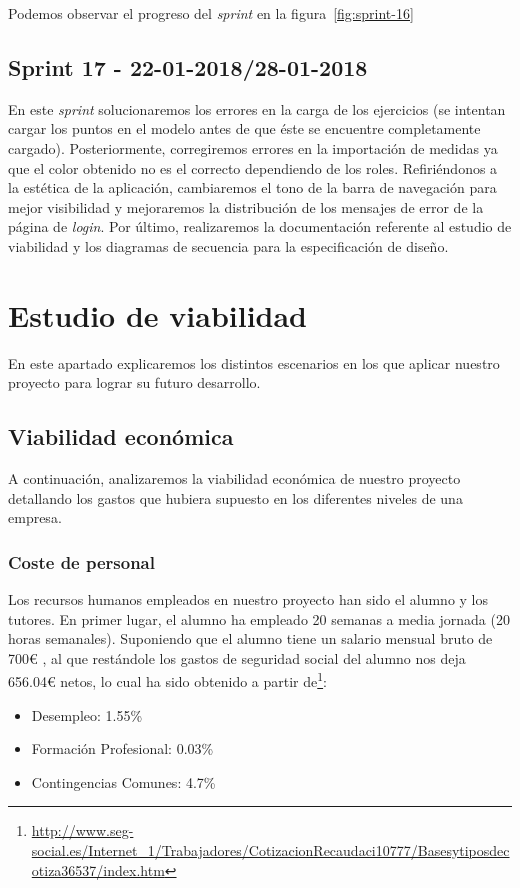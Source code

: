 Podemos observar el progreso del \textit{sprint} en la figura~\ref{fig:sprint-16}

\subsection{Sprint 17 - 22-01-2018/28-01-2018}
En este \textit{sprint} solucionaremos los errores en la carga de los ejercicios (se intentan cargar los puntos en el modelo antes de que éste se encuentre completamente cargado). Posteriormente, corregiremos errores en la importación de medidas ya que el color obtenido no es el correcto dependiendo de los roles. Refiriéndonos a la estética de la aplicación, cambiaremos el tono de la barra de navegación para mejor visibilidad y mejoraremos la distribución de los mensajes de error de la página de \textit{login}. Por último, realizaremos la documentación referente al estudio de viabilidad y los diagramas de secuencia para la especificación de diseño.


\section{Estudio de viabilidad}
En este apartado explicaremos los distintos escenarios en los que aplicar nuestro proyecto para lograr su futuro desarrollo.

\subsection{Viabilidad económica}
A continuación, analizaremos la viabilidad económica de nuestro proyecto detallando los gastos que hubiera supuesto en los diferentes niveles de una empresa.

\subsubsection{Coste de personal}
Los recursos humanos empleados en nuestro proyecto han sido el alumno y los tutores. En primer lugar, el alumno ha empleado 20 semanas a media jornada (20 horas semanales). Suponiendo que el alumno tiene un salario mensual bruto de 700\euro{} , al que restándole los gastos de seguridad social del alumno nos deja 656.04\euro{} netos, lo cual ha sido obtenido a partir de\footnote{\url{http://www.seg-social.es/Internet_1/Trabajadores/CotizacionRecaudaci10777/Basesytiposdecotiza36537/index.htm}}:

\begin{itemize}
	\item Desempleo: 1.55\%
	\item Formación Profesional: 0.03\%
	\item Contingencias Comunes: 4.7\%
\end{itemize}

